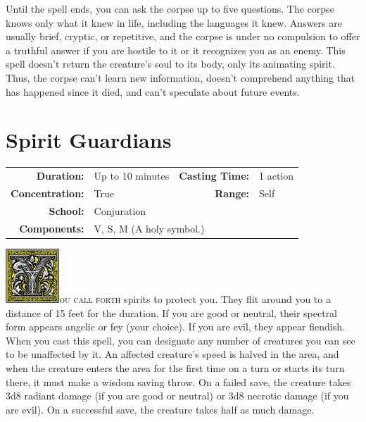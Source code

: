 \documentclass[12pt,showtrims]{memoir}
\begin{document}
Until the spell ends, you can ask the corpse up to five questions. The corpse knows only what it knew in life, including the languages it knew. Answers are usually brief, cryptic, or repetitive, and the corpse is under no compulsion to offer a truthful answer if you are hostile to it or it recognizes you as an enemy. This spell doesn’t return the creature’s soul to its body, only its animating spirit. Thus, the corpse can’t learn new information, doesn’t comprehend anything that has happened since it died, and can’t speculate about future events.
\newpage
\begin{figure}[p]
\end{figure}
\newpage
\FloatBarrier
\section*{Spirit Guardians}

{
\small\centering\vspace{-6pt}
\begin{tabular}{rlrl}
\toprule

\textbf{Duration:} & Up to 10 minutes &
\textbf{Casting Time:} & 1 action \\
\textbf{Concentration:} & True &
\textbf{Range:} & Self \\
\textbf{School:} & Conjuration \\
\textbf{Components:} & \multicolumn{3}{p{0.7\textwidth}}{V, S, M (A holy symbol.)}\\

\bottomrule
\end{tabular}
}

\vspace{1\baselineskip}\noindent 
\lettrine[lines=4]{\includegraphics[height=58pt]{initials/Y.png}}{ou call forth} spirits to protect you. They flit around you to a distance of 15 feet for the duration. If you are good or neutral, their spectral form appears angelic or fey (your choice). If you are evil, they appear fiendish. When you cast this spell, you can designate any number of creatures you can see to be unaffected by it. An affected creature's speed is halved in the area, and when the creature enters the area for the first time on a turn or starts its turn there, it must make a wisdom saving throw. On a failed save, the creature takes 3d8 radiant damage (if you are good or neutral) or 3d8 necrotic damage (if you are evil). On a successful save, the creature takes half as much damage.
\end{document}
